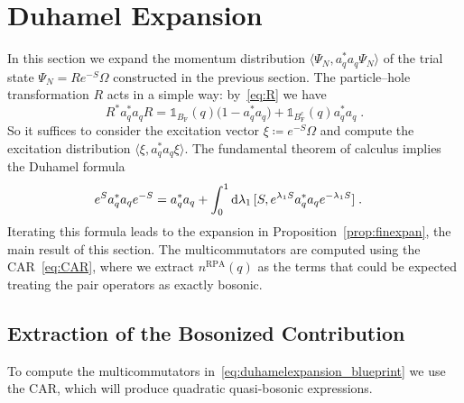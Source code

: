 \documentclass[12pt,a4paper]{article}
\numberwithin{equation}{section}
\newcommand{\1}{\mathbb{I}}
\newcommand{\di}{\textnormal{d}}
\newcommand{\F}{\mathrm{F}}
\newcommand{\RPA}{\mathrm{RPA}}
\theoremstyle{plain}
\theoremstyle{definition}
\theoremstyle{remark}
\theoremstyle{plain}
\theoremstyle{definition}
\theoremstyle{remark}
\begin{document}
\section{Duhamel Expansion}\label{sec:extraction}

In this section we expand the momentum distribution $ \langle \Psi_N, a_q^* a_q \Psi_N \rangle $ of the trial state $ \Psi_N = R e^{-S} \Omega $ constructed in the previous section.
%
The particle--hole transformation $ R $ acts in a simple way: by~\eqref{eq:R} we have
\begin{equation} \label{eq:momentum_dist_R_trafo}
	R^* a_q^* a_q R
	= \mathds{1}_{B_{\F}}(q) \big( 1 - a_q^* a_q  \big)
		+ \mathds{1}_{B_{\F}^c}(q)  a_q^* a_q \;.
\end{equation}
So it suffices to consider the excitation vector $ \xi \coloneq e^{-S} \Omega $ and  compute the excitation distribution $ \langle \xi, a_q^* a_q \xi \rangle $. The fundamental theorem of calculus implies the Duhamel formula
\begin{equation} \label{eq:duhamelexpansion_blueprint}
\begin{aligned}
	e^{S} a_q^* a_q e^{-S}
& = a_q^* a_q
		+ \int_0^1 \di \lambda_1 \,   [S, e^{\lambda_1 S} a_q^* a_q e^{-\lambda_1 S}] \;.
\end{aligned}
\end{equation}
Iterating this formula leads to the expansion in Proposition~\ref{prop:finexpan}, the main result of this section. The multicommutators are computed using the CAR~\eqref{eq:CAR}, where we extract $ n^{\RPA}(q) $ as the terms that could be expected treating the pair operators as exactly bosonic.



\subsection{Extraction of the Bosonized Contribution}
\label{sec:extraction_bos}

To compute the multicommutators in~\eqref{eq:duhamelexpansion_blueprint} we use the CAR, which will produce quadratic quasi-bosonic expressions.
\end{document}
